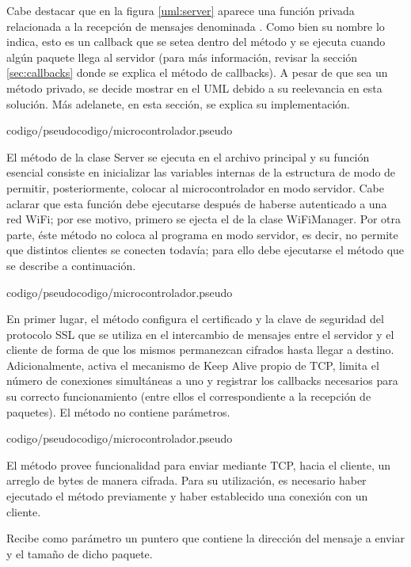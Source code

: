 Cabe destacar que en la figura \ref{uml:server} aparece una función privada relacionada a la recepción de mensajes denominada .
Como bien su nombre lo indica, esto es un callback que se setea dentro del método  y se ejecuta cuando algún paquete llega al servidor (para más información, revisar la sección \ref{sec:callbacks} donde se explica el método de callbacks).
A pesar de que sea un método privado, se decide mostrar en el UML debido a su reelevancia en esta solución.
Más adelanete, en esta sección, se explica su implementación.

 {codigo/pseudocodigo/microcontrolador.pseudo}

El método  de la clase Server se ejecuta en el archivo principal y su función esencial consiste en inicializar las variables internas de la estructura de modo de permitir, posteriormente, colocar al microcontrolador en modo servidor.
Cabe aclarar que esta función debe ejecutarse después de haberse autenticado a una red WiFi; por ese motivo, primero se ejecta el  de la clase WiFiManager.
Por otra parte, éste método no coloca al programa en modo servidor, es decir, no permite que distintos clientes se conecten todavía; para ello debe ejecutarse el método  que se describe a continuación.

 {codigo/pseudocodigo/microcontrolador.pseudo}

En primer lugar, el método  configura el certificado y la clave de seguridad del protocolo SSL que se utiliza en el intercambio de mensajes entre el servidor y el cliente de forma de que los mismos permanezcan cifrados hasta llegar a destino.
Adicionalmente, activa el mecanismo de Keep Alive propio de TCP, limita el número de conexiones simultáneas a uno y registrar los callbacks necesarios para su correcto funcionamiento (entre ellos el correspondiente a la recepción de paquetes).
El método no contiene parámetros.

 {codigo/pseudocodigo/microcontrolador.pseudo}

El método  provee funcionalidad para enviar mediante TCP, hacia el cliente, un arreglo de bytes de manera cifrada.
Para su utilización, es necesario haber ejecutado el método  previamente y haber establecido una conexión con un cliente.

Recibe como parámetro un puntero que contiene la dirección del mensaje a enviar y el tamaño de dicho paquete.

